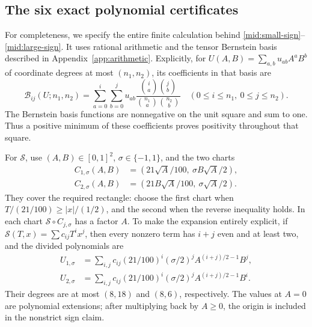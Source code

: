 \subsection{The six exact polynomial certificates}

For completeness, we specify the entire finite calculation behind
\eqref{mid:small-sign}--\eqref{mid:large-sign}. It uses rational
arithmetic and the tensor Bernstein basis described in
Appendix~\ref{app:arithmetic}. Explicitly, for
\(U(A,B)=\sum_{a,b}u_{ab}A^aB^b\) of coordinate degrees at most
\((n_1,n_2)\), its coefficients in that basis are
\begin{equation}\label{mid:Bernstein-transform}
 \mathcal B_{ij}(U;n_1,n_2)
 =\sum_{a=0}^{i}\sum_{b=0}^{j}
 u_{ab}\frac{\binom ia\binom jb}{\binom{n_1}a\binom{n_2}b}
 \quad(0\le i\le n_1,\ 0\le j\le n_2).
\end{equation}
The Bernstein basis functions are nonnegative on the unit square and
sum to one. Thus a positive minimum of these coefficients proves
positivity throughout that square.

For \(\mathcal S\), use \((A,B)\in[0,1]^2\), \(\sigma\in\{-1,1\}\),
and the two charts
\begin{align}
 C_{1,\sigma}(A,B)&=(21\sqrt A/100,\ \sigma B\sqrt A/2),
 \label{mid:chart-one}\\
 C_{2,\sigma}(A,B)&=(21B\sqrt A/100,\ \sigma\sqrt A/2).
 \label{mid:chart-two}
\end{align}
They cover the required rectangle: choose the first chart when
\(T/(21/100)\ge |x|/(1/2)\), and the second when the reverse
inequality holds. In each chart \(\mathcal S\circ C_{j,\sigma}\)
has a factor \(A\). To make the expansion entirely explicit, if
\(\mathcal S(T,x)=\sum c_{ij}T^ix^j\), then every nonzero term has
\(i+j\) even and at least two, and the divided polynomials are
\begin{align}
 U_{1,\sigma}
 &=\sum_{i,j}c_{ij}(21/100)^i(\sigma/2)^j
      A^{(i+j)/2-1}B^j,\label{mid:chart-expansion-one}\\
 U_{2,\sigma}
 &=\sum_{i,j}c_{ij}(21/100)^i(\sigma/2)^j
      A^{(i+j)/2-1}B^i.\label{mid:chart-expansion-two}
\end{align}
Their degrees are at most \((8,18)\) and \((8,6)\), respectively.
The values at \(A=0\) are polynomial extensions; after multiplying
back by \(A\ge0\), the origin is included in the nonstrict sign claim.

